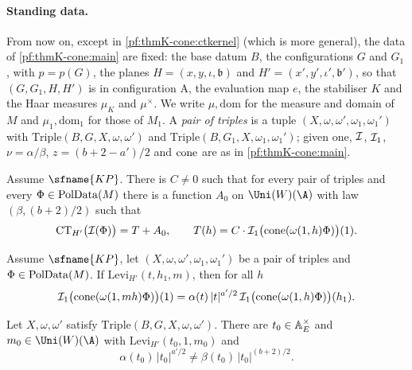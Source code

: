 \paragraph{Standing data.}
From now on, except in \cref{pf:thmK-cone:ctkernel} (which is more general), the data of \cref{pf:thmK-cone:main} are
fixed: the base datum $B$, the configurations $G$ and $G_1$, with $p=p(G)$, the planes $H=(x,y,\iota,\mathfrak b)$ and
$H'=(x',y',\iota',\mathfrak b')$, so that $(G,G_1,H,H')$ is in configuration A, the evaluation map $e$, the stabiliser $K$
and the Haar measures $\mu_K$ and $\mu^\times$.  We write $\mu,\mathrm{dom}$ for the measure and domain of $M$ and
$\mu_1,\mathrm{dom}_1$ for those of $M_1$.  A \emph{pair of triples} is a tuple $(X,\omega,\omega',\omega_1,\omega_1')$
with $\mathrm{Triple}(B,G,X,\omega,\omega')$ and $\mathrm{Triple}(B,G_1,X,\omega_1,\omega_1')$; given one, $\mathcal{I}$,
$\mathcal{I}_1$, $\nu=\alpha/\beta$, $z=(b+2-a')/2$ and $\operatorname{cone}$ are as in \cref{pf:thmK-cone:main}.

\begin{proposition}\label{pf:thmK-cone:propA}
Assume $\sfname{KP}$.  There is $C\neq0$ such that for every pair of triples and every $\Phi\in\operatorname{PolData}(M)$ there is
a function $A_0$ on $\Uni(W)(\A)$ with law $(\beta,(b+2)/2)$ such that
\[
  \mathrm{CT}_{H'}\bigl(\mathcal{I}(\Phi)\bigr)=T+A_0,\qquad
  T(h)=C\cdot\mathcal{I}_1\bigl(\operatorname{cone}(\omega(1,h)\Phi)\bigr)(1).
\]
\end{proposition}

\begin{proposition}\label{pf:thmK-cone:propB}
Assume $\sfname{KP}$, let $(X,\omega,\omega',\omega_1,\omega_1')$ be a pair of triples and $\Phi\in\operatorname{PolData}(M)$.  If
$\mathrm{Levi}_{H'}(t,h_1,m)$, then for all $h$
\[
  \mathcal{I}_1\bigl(\operatorname{cone}(\omega(1,mh)\Phi)\bigr)(1)
  =\alpha(t)\,|t|^{a'/2}\,\mathcal{I}_1\bigl(\operatorname{cone}(\omega(1,h)\Phi)\bigr)(h_1).
\]
\end{proposition}

\begin{lemma}\label{pf:thmK-cone:lawsep}
Let $X,\omega,\omega'$ satisfy $\mathrm{Triple}(B,G,X,\omega,\omega')$.  There are $t_0\in\mathbb{A}_E^\times$ and
$m_0\in\Uni(W)(\A)$ with $\mathrm{Levi}_{H'}(t_0,1,m_0)$ and
\[
  \alpha(t_0)\,|t_0|^{a'/2}\neq\beta(t_0)\,|t_0|^{(b+2)/2}.
\]
\end{lemma}

